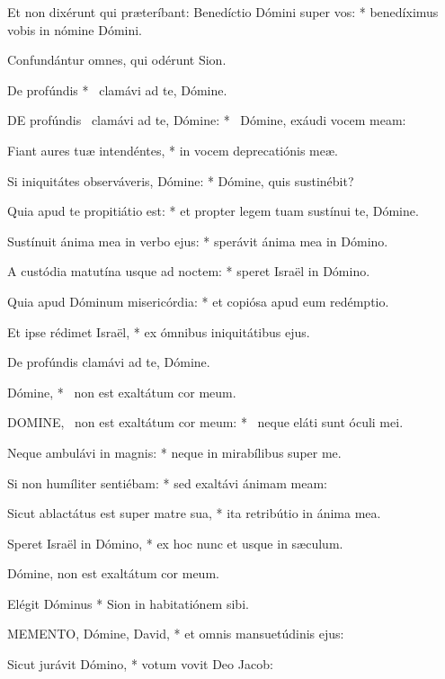 Et non dixérunt qui præteríbant: Benedíctio Dómini super vos: * benedíximus vobis in nómine Dómini.

 Confundántur omnes, qui odérunt Sion.

 De profúndis * \textdagger\ clamávi ad te, Dómine. \textdaggerdbl


\lettrine[lines=2]{D}{E} profúndis \textdagger\ clamávi ad te, Dómine: * \textdaggerdbl\ Dómine, exáudi vocem meam:

Fiant aures tuæ intendéntes, * in vocem deprecatiónis meæ.

Si iniquitátes observáveris, Dómine: * Dómine, quis sustinébit?

Quia apud te propitiátio est: * et propter legem tuam sustínui te, Dómine.

Sustínuit ánima mea in verbo ejus: * sperávit ánima mea in Dómino.

A custódia matutína usque ad noctem: * speret Israël in Dómino.

Quia apud Dóminum misericórdia: * et copiósa apud eum redémptio.

Et ipse rédimet Israël, * ex ómnibus iniquitátibus ejus.

 De profúndis clamávi ad te, Dómine.

 Dómine, * \textdagger\ non est exaltátum cor meum. \textdaggerdbl


\lettrine[lines=2]{D}{OMINE}, \textdagger\ non est exaltátum cor meum: * \textdaggerdbl\ neque eláti sunt óculi mei.

Neque ambulávi in magnis: * neque in mirabílibus super me.

Si non humíliter sentiébam: * sed exaltávi ánimam meam:

Sicut ablactátus est super matre sua, * ita retribútio in ánima mea.

Speret Israël in Dómino, * ex hoc nunc et usque in sæculum.

 Dómine, non est exaltátum cor meum.

 Elégit Dóminus * Sion in habitatiónem sibi.


\lettrine[lines=2]{M}{EMENTO}, Dómine, David, * et omnis mansuetúdinis ejus:

Sicut jurávit Dómino, * votum vovit Deo Jacob:


